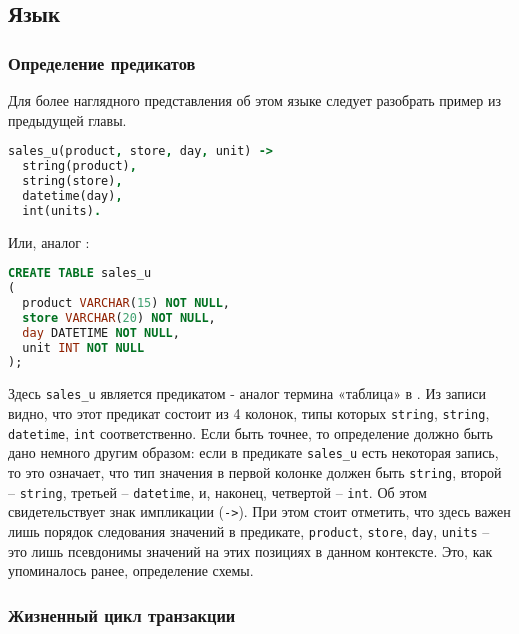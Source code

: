 \subsection{Язык \logiql}
\label{sec:technology:logiql}

\subsubsection{Определение предикатов}
\label{sec:technology:logiql:predicates}

Для более наглядного представления об этом языке следует разобрать пример из предыдущей главы.

\begin{lstlisting}[language=Prolog]
sales_u(product, store, day, unit) ->
  string(product),
  string(store),
  datetime(day),
  int(units).
\end{lstlisting}

Или, аналог \sql:

\begin{lstlisting}[language=SQL]
CREATE TABLE sales_u
(
  product VARCHAR(15) NOT NULL,
  store VARCHAR(20) NOT NULL,
  day DATETIME NOT NULL,
  unit INT NOT NULL
);
\end{lstlisting}

Здесь \lstinline{sales_u} является предикатом - аналог термина «таблица» в
\sql. Из записи видно, что этот предикат состоит из 4 колонок, типы которых \lstinline{string}, \lstinline{string}, \lstinline{datetime}, \lstinline{int} соответственно. Если быть точнее, то определение должно быть дано немного другим образом: если в предикате \lstinline{sales_u} есть некоторая запись, то это означает, что тип значения в первой колонке должен быть \lstinline{string}, второй – \lstinline{string}, третьей – \lstinline{datetime}, и, наконец, четвертой – \lstinline{int}. Об этом свидетельствует знак импликации (\lstinline{->}). При этом стоит отметить, что здесь важен лишь порядок следования значений в предикате, \lstinline{product}, \lstinline{store}, \lstinline{day}, \lstinline{units} – это лишь псевдонимы значений на этих позициях в данном контексте. Это, как упоминалось ранее, определение схемы.

\subsubsection{Жизненный цикл транзакции}
\label{sec:technology:logiql:transaction}

